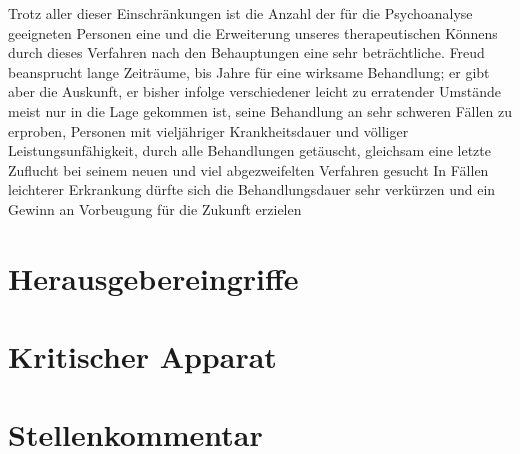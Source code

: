 \documentclass[twoside=true,titlepage=false,open=any, parskip=never, fontsize=10pt, headings=small, chapterprefix=false, appendixprefix=false]{scrbook}
\begin{document}
            
        \pstart
        Trotz aller dieser Einschränkungen ist die Anzahl der für die Psychoanalyse
               geeigneten Personen eine und die Erweiterung unseres therapeutischen Könnens durch dieses
               Verfahren nach den Behauptungen  eine sehr beträchtliche. Freud
               beansprucht lange Zeiträume,  bis  Jahre für eine wirksame Behandlung; er gibt aber die Auskunft,  er bisher infolge verschiedener leicht zu erratender Umstände meist nur
               in die Lage gekommen ist, seine Behandlung an sehr schweren Fällen zu erproben,
               Personen mit vieljähriger Krankheitsdauer und völliger Leistungsunfähigkeit,  durch alle Behandlungen getäuscht, gleichsam eine letzte Zuflucht bei
               seinem neuen und viel abgezweifelten Verfahren gesucht  In Fällen leichterer Erkrankung dürfte sich die Behandlungsdauer
               sehr verkürzen und ein  Gewinn an Vorbeugung für die Zukunft erzielen 
               
            
        \pend
    
         
        \endnumbering
        
        \section*{Herausgebereingriffe}
  
        \section*{Kritischer Apparat}
        
        \section*{Stellenkommentar}
        
        \printindex[person]
        \printindex[kw]
        


        
\end{document}
